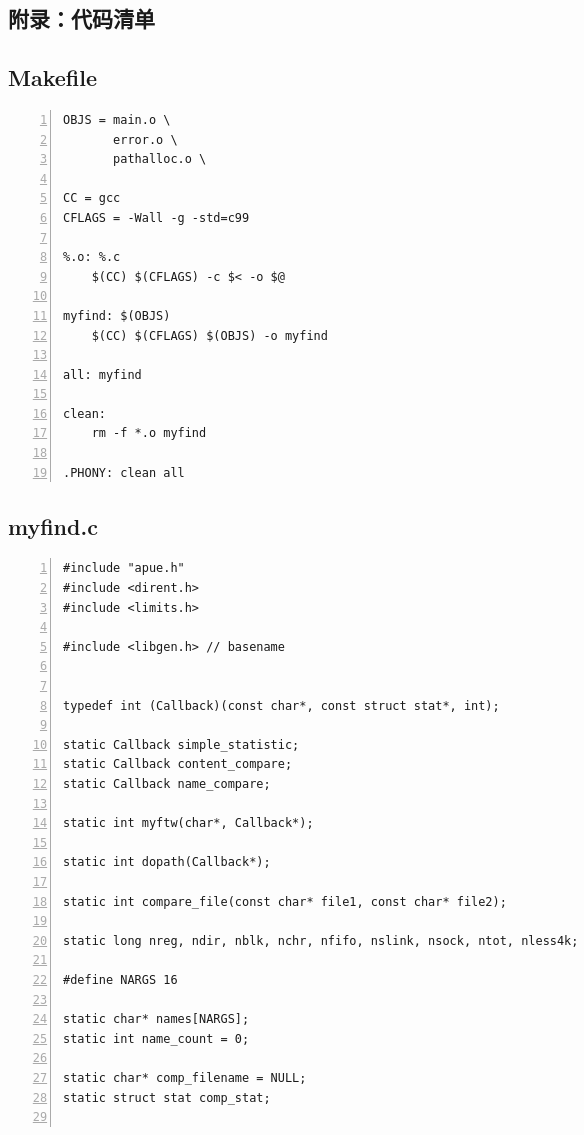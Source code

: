 \documentclass[a4paper,twoside]{article}
\begin{document}
\begin{spacing}{1.2}
\appendix
\clearpage
\section*{附录：代码清单}
\label{sec:code}

\subsection{Makefile}

\begin{lstlisting}[numbers=left,style=MakefileStyle,caption=Makefile,label={code:makefile}]
OBJS = main.o \
	   error.o \
	   pathalloc.o \

CC = gcc
CFLAGS = -Wall -g -std=c99

%.o: %.c
	$(CC) $(CFLAGS) -c $< -o $@

myfind: $(OBJS)
	$(CC) $(CFLAGS) $(OBJS) -o myfind

all: myfind

clean:
	rm -f *.o myfind

.PHONY: clean all
\end{lstlisting}

\subsection{myfind.c}

\begin{lstlisting}[numbers=left,style=CppStyle,caption=程序实现,label={code:impl}]
#include "apue.h"
#include <dirent.h>
#include <limits.h>

#include <libgen.h> // basename


typedef int (Callback)(const char*, const struct stat*, int);

static Callback simple_statistic;
static Callback content_compare;
static Callback name_compare;

static int myftw(char*, Callback*);

static int dopath(Callback*);

static int compare_file(const char* file1, const char* file2);

static long nreg, ndir, nblk, nchr, nfifo, nslink, nsock, ntot, nless4k;

#define NARGS 16

static char* names[NARGS];
static int name_count = 0;

static char* comp_filename = NULL;
static struct stat comp_stat;


\end{lstlisting}
\end{spacing}
\end{document}
